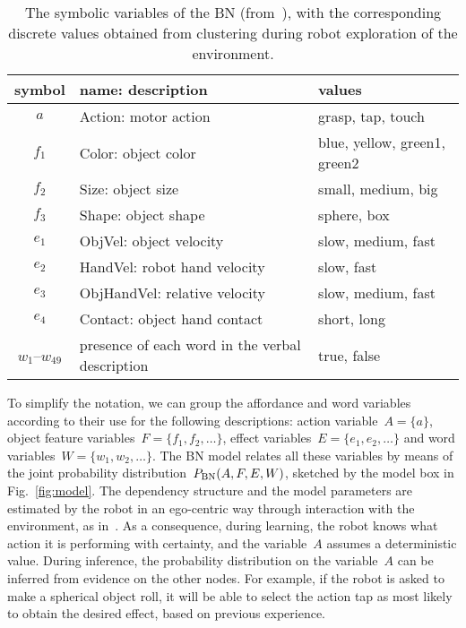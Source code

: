 \begin{table}
    \centering
    \caption{The symbolic variables of the \acl{BN} (from~\cite{salvi:2012:smcb}), with the corresponding discrete values obtained from clustering during robot exploration of the environment.}
    \label{tab:bnsymb}
    \begin{tabular}{cp{3.3cm}l}
    \toprule
    symbol & name: description     & values \\
    \midrule
    $a$ & Action: motor action          & grasp, tap, touch \\
    \midrule
    $f_1$ & Color: object color   & blue, yellow, green1, green2 \\
    $f_2$ & Size: object size     & small, medium, big \\
    $f_3$ & Shape: object shape    & sphere, box \\
    \midrule
    $e_1$ & ObjVel: object velocity & slow, medium, fast \\
    $e_2$ & HandVel: robot hand velocity & slow, fast \\
    $e_3$ & ObjHandVel: relative \objecthand{} velocity & slow, medium, fast \\
    $e_4$ & Contact: object hand contact & short, long \\
    \midrule
    $w_1$--$w_{49}$ & presence of each word in the verbal description & true, false \\
    \bottomrule
    \end{tabular}
\end{table}

To simplify the notation, we can group the affordance and word variables according to their use for the following descriptions: action variable~$A = \{a\}$, object feature variables~$F=\{f_1, f_2, \dots\}$, effect variables~$E=\{e_1, e_2, \dots\}$ and word variables~$W = \{w_1, w_2, \dots\}$.
The \ac{BN} model relates all these variables by means of the joint probability distribution~$P_{\text{BN}}(A, F, E, W)$, sketched by the \AffWords{} model box in Fig.~\ref{fig:model}.
The dependency structure and the model parameters are estimated by the robot in an ego-centric way through interaction with the environment, as in~\cite{salvi:2012:smcb}.
As a consequence, during learning, the robot knows what action it is performing with certainty, and the variable~$A$ assumes a deterministic value.
During inference, the probability distribution on the variable~$A$ can be inferred from evidence on the other nodes.
For example, if the robot is asked to make a spherical object roll, it will be able to select the action tap as most likely to obtain the desired effect, based on previous experience.

